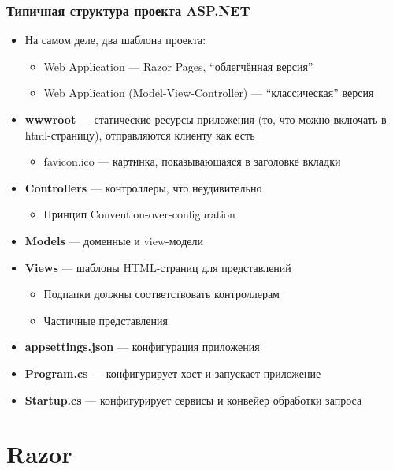 \documentclass{../../slides-style}
\begin{document}
    \begin{frame}
        \frametitle{Типичная структура проекта ASP.NET}
        \begin{itemize}
            \item На самом деле, два шаблона проекта:
            \begin{itemize}
                \item Web Application --- Razor Pages, ``облегчённая версия''
                \item Web Application (Model-View-Controller) --- ``классическая'' версия
            \end{itemize}
            \item \textbf{wwwroot} --- статические ресурсы приложения (то, что можно включать в html-страницу), отправляются клиенту как есть
            \begin{itemize}
                \item favicon.ico --- картинка, показывающаяся в заголовке вкладки
            \end{itemize}
            \item \textbf{Controllers} --- контроллеры, что неудивительно
            \begin{itemize}
                \item Принцип Convention-over-configuration
            \end{itemize}
            \item \textbf{Models} --- доменные и view-модели
            \item \textbf{Views} --- шаблоны HTML-страниц для представлений
            \begin{itemize}
                \item Подпапки должны соответствовать контроллерам
                \item Частичные представления
            \end{itemize}
            \item \textbf{appsettings.json} --- конфигурация приложения
            \item \textbf{Program.cs} --- конфигурирует хост и запускает приложение
            \item \textbf{Startup.cs} --- конфигурирует сервисы и конвейер обработки запроса
        \end{itemize}
    \end{frame}

    \section{Razor}
\end{document}
